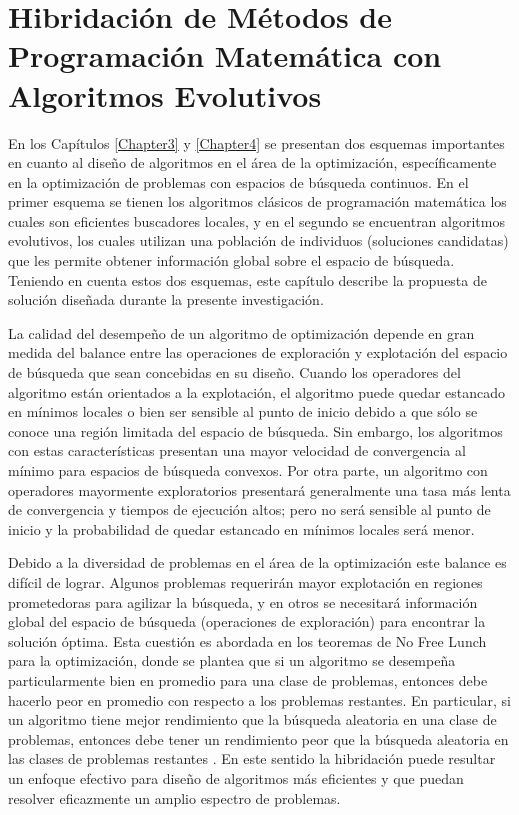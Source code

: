 \chapter{Hibridación de Métodos de Programación Matemática con Algoritmos Evolutivos} \label{Chapter6} 


En los Capítulos \ref{Chapter3} y \ref{Chapter4} se presentan dos esquemas importantes en cuanto al diseño de algoritmos en el área de la optimización, específicamente en la optimización de problemas con espacios de búsqueda continuos. En el primer esquema se tienen los algoritmos clásicos de programación matemática los cuales son eficientes buscadores locales, y  en el segundo se encuentran algoritmos evolutivos, los cuales utilizan una población de individuos (soluciones candidatas) que les permite obtener información global sobre el espacio de búsqueda. Teniendo en cuenta estos dos esquemas, este capítulo describe la propuesta de solución diseñada durante la presente investigación.

La calidad del desempeño de un algoritmo de optimización depende en gran medida del balance entre las operaciones de exploración y explotación del espacio de búsqueda que sean concebidas en su diseño. Cuando los operadores del algoritmo están orientados a la explotación, el algoritmo puede quedar estancado en mínimos locales o bien ser sensible al punto de inicio debido a que sólo se conoce una región limitada del espacio de búsqueda. Sin embargo, los algoritmos con estas características presentan una mayor velocidad de convergencia al mínimo para espacios de búsqueda convexos. Por otra parte, un algoritmo con operadores mayormente exploratorios presentará generalmente una tasa más lenta de convergencia y tiempos de ejecución altos; pero no será sensible al punto de inicio y la probabilidad de quedar estancado en mínimos locales será menor.

Debido a la diversidad de problemas en el área de la optimización este balance es difícil de lograr. Algunos problemas requerirán mayor explotación en regiones prometedoras para agilizar la búsqueda, y en otros se necesitará información global del espacio de búsqueda (operaciones de exploración) para encontrar la solución óptima. Esta cuestión es abordada en los teoremas de No Free Lunch para la optimización, donde se plantea que si un algoritmo se desempeña particularmente bien en promedio para una clase de problemas, entonces debe hacerlo peor en promedio con respecto a los problemas restantes. En particular, si un algoritmo tiene mejor rendimiento que la búsqueda aleatoria en una clase de problemas, entonces debe tener un rendimiento peor que la búsqueda aleatoria en las clases de problemas restantes \cite{wolpert1997no}. En este sentido la hibridación puede resultar un enfoque efectivo para diseño de algoritmos más eficientes y que puedan resolver eficazmente un amplio espectro de problemas.

